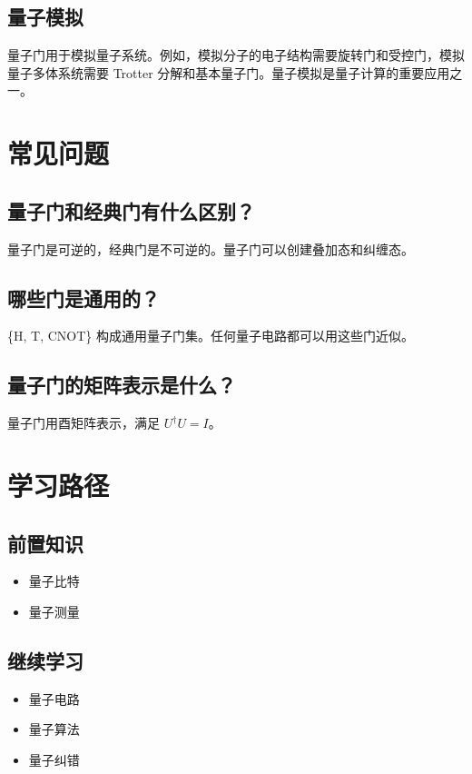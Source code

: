 \documentclass[12pt,a4paper]{article}
\begin{document}
\subsection{量子模拟}

量子门用于模拟量子系统。例如，模拟分子的电子结构需要旋转门和受控门，模拟量子多体系统需要 Trotter 分解和基本量子门。量子模拟是量子计算的重要应用之一。

\section{常见问题}

\subsection{量子门和经典门有什么区别？}

量子门是可逆的，经典门是不可逆的。量子门可以创建叠加态和纠缠态。

\subsection{哪些门是通用的？}

\{H, T, CNOT\} 构成通用量子门集。任何量子电路都可以用这些门近似。

\subsection{量子门的矩阵表示是什么？}

量子门用酉矩阵表示，满足 $U^\dagger U = I$。

\section{学习路径}

\subsection{前置知识}
\begin{itemize}
  \item 量子比特
  \item 量子测量
\end{itemize}

\subsection{继续学习}
\begin{itemize}
  \item 量子电路
  \item 量子算法
  \item 量子纠错
\end{itemize}
\end{document}

